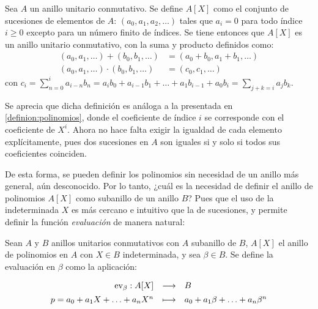 \begin{deff}{\cite[p.~149]{Hungerford}}\label{definicion:gen_polinomios}
    Sea $A$ un anillo unitario conmutativo. Se define $A[X]$ como el conjunto de sucesiones de elementos de $A$: $(a_0, a_1, a_2, \ldots)$ tales que $a_i = 0$ para todo índice $i\geq 0 $ excepto para un número finito de índices. Se tiene entonces que $A[X]$ es un anillo unitario conmutativo, con la suma y producto definidos como:
    \begin{align*}
        (a_0, a_1, \ldots) + (b_0, b_1, \ldots) &= (a_0 + b_0, a_1 + b_1, \ldots)\\[1ex]
        (a_0, a_1, \ldots) \cdot (b_0, b_1, \ldots) &= (c_0, c_1, \ldots)
    \end{align*}
    con $c_i = \sum\limits_{n=0}^i a_{i-n}b_n = a_ib_0 + a_{i-1}b_1 + \ldots + a_1b_{i-1} + a_0b_i = \sum\limits_{j + k=i} a_jb_k$.
\end{deff}

\begin{obs}
    Se aprecia que dicha definición es análoga a la presentada en \ref{definion:polinomios}, donde el coeficiente de índice $i$ se corresponde con el coeficiente de $X^i$. Ahora no hace falta exigir la igualdad de cada elemento explícitamente, pues dos sucesiones en $A$ son iguales si y solo si todos sus coeficientes coinciden. 
\end{obs}

De esta forma, se pueden definir los polinomios sin necesidad de un anillo más general, aún desconocido. Por lo tanto, ¿cuál es la necesidad de definir el anillo de polinomios $A[X]$ como subanillo de un anillo $B$? Pues que el uso de la indeterminada $X$ es más cercano e intuitivo que la de sucesiones, y permite definir la función \textit{evaluación} de manera natural:

\begin{deff}{\cite[p.~112]{GamboaAnillos}}
    Sean $A$ y $B$ anillos unitarios conmutativos con $A$ subanillo de $B$, $A[X]$ el anillo de polinomios en $A$ con $X\in B$ indeterminada, y sea $\beta \in B$. Se define la evaluación en $\beta$ como la aplicación:
    
    \[
    \begin{array}{rcl}
    \operatorname{ev}_\beta : A[X] & \longrightarrow & B \\[1ex]
    p = a_0 + a_1X + \ldots + a_nX^n & \longmapsto & a_0 + a_1\beta + \ldots + a_n\beta^n
    \end{array}
    \]
\end{deff}

